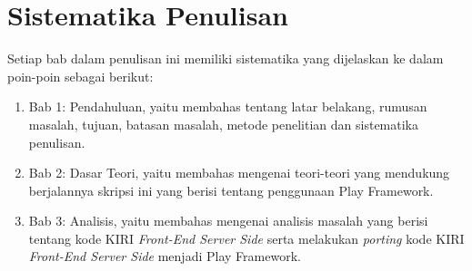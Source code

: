 \section{Sistematika Penulisan}
\label{sec:sistematikaPenulisan}
Setiap bab dalam penulisan ini memiliki sistematika yang dijelaskan ke dalam poin-poin sebagai berikut:
	\begin{enumerate}
		\item Bab 1: Pendahuluan, yaitu membahas tentang latar belakang, rumusan masalah, tujuan, batasan masalah, metode penelitian dan sistematika penulisan.
		\item Bab 2: Dasar Teori, yaitu membahas mengenai teori-teori yang mendukung berjalannya skripsi ini yang berisi tentang penggunaan Play Framework.
		\item Bab 3: Analisis, yaitu membahas mengenai analisis masalah yang berisi tentang kode KIRI \textit{Front-End Server Side} serta melakukan \textit{porting} kode KIRI \textit{Front-End Server Side} menjadi Play Framework.
	\end{enumerate}